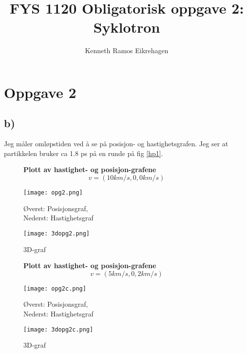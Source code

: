\documentclass[a4paper,12pt,norsk]{article}
\title{FYS 1120 Obligatorisk oppgave 2: Syklotron}
\author{Kenneth Ramos Eikrehagen}
\begin{document}
\newcommand{\understrek}[1]{\underline{\underline{#1}}}
\maketitle
\tableofcontents

\section{Oppgave 2}

\subsection{b)}
Jeg måler omløpstiden ved å se på posisjon- og hastighetsgrafen. Jeg ser at partikkelen bruker ca 1.8 ps på en runde på fig \ref{hp1}.\\

\begin{figure}[H]
\begin{center}
\textbf{Plott av hastighet- og posisjon-grafene$$v=(10km/s,0,0km/s)$$}\par\medskip
\end{center}
\begin{minipage}[b]{0.45\linewidth}
\centering
\texttt{[image: opg2.png]}
\caption{Øverst: Posisjonsgraf, \\Nederst: Hastighetsgraf}
\label{hp1}
\end{minipage}
\hspace{0.5cm}
\begin{minipage}[b]{0.45\linewidth}
\centering
\texttt{[image: 3dopg2.png]}
\caption{3D-graf}
\label{3d1}
\end{minipage}
\begin{center}
\textbf{Plott av hastighet- og posisjon-grafene $$v=(5km/s,0,2km/s)$$}\par\medskip
\end{center}
\begin{minipage}[b]{0.45\linewidth}
\centering
\texttt{[image: opg2c.png]}
\caption{Øverst: Posisjonsgraf, \\Nederst: Hastighetsgraf}
\label{hp2}
\end{minipage}
\hspace{0.5cm}
\begin{minipage}[b]{0.45\linewidth}
\centering
\texttt{[image: 3dopg2c.png]}
\caption{3D-graf}
\label{3d2}
\end{minipage}
\end{figure}
\end{document}
